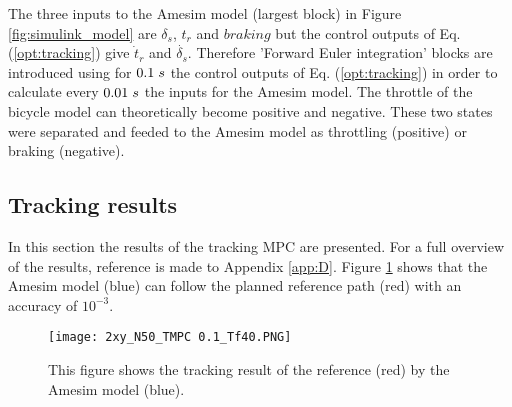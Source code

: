 The three inputs to the Amesim model (largest block)  in Figure \ref{fig:simulink_model} are $\delta_s$, $t_r$ and $braking$ but the control outputs of Eq. (\ref{opt:tracking}) give $\dot{t}_r$ and $\dot{\delta_s}$. Therefore 'Forward Euler integration' blocks are introduced using for $0.1\hspace{1mm}s$ the control outputs of Eq. (\ref{opt:tracking}) in order to calculate every $0.01\hspace{1mm}s$ the inputs for the Amesim model. The throttle of the bicycle model can theoretically become positive and negative. These two states were separated and feeded to the Amesim model as throttling (positive) or braking (negative). 


\subsection{Tracking results} 
\label{s:tracking_results}

In this section the results of the tracking MPC are presented. For a full overview of the results, reference is made to Appendix \ref{app:D}. Figure \ref{fig:xy_mpc} shows that the Amesim model (blue) can follow the planned reference path (red) with an accuracy of $10^{-3}$. 

\begin{figure}[h!]
	\centering
	\texttt{[image: 2xy\_N50\_TMPC 0.1\_Tf40.PNG]}
	\caption{This figure shows the tracking result of the reference (red) by the Amesim model (blue).}	
	\label{fig:xy_mpc}
\end{figure}

